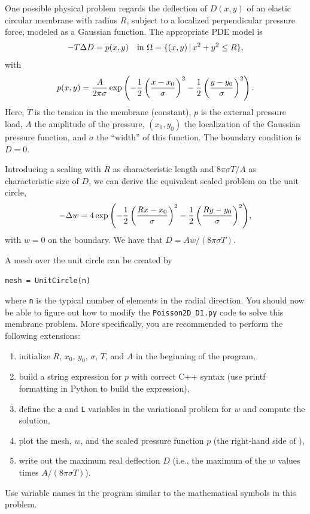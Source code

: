 One possible physical problem regards the deflection
of $D(x,y)$ of an elastic circular membrane
with radius $R$, subject to a localized perpendicular pressure
force, modeled as a Gaussian function.
The appropriate PDE model is
\begin{equation}
-T\Delta D = p(x,y)\quad\hbox{in }\Omega = \{ (x,y)\,|\, x^2+y^2\leq R\},
\end{equation}
with
\begin{equation}
p(x,y) = {A\over 2\pi\sigma}\exp{\left(
- {1\over2}\left( {x-x_0\over\sigma}\right)^2
- {1\over2}\left( {y-y_0\over\sigma}\right)^2
\right)}\, .
\end{equation}
Here, $T$ is the tension in the membrane (constant), $p$ is the external
pressure load,
$A$ the amplitude of the pressure, $(x_0,y_0)$ the localization of
the Gaussian pressure function, and $\sigma$ the ``width'' of this
function. The boundary condition is $D=0$.

Introducing a scaling with $R$ as characteristic length and
$8\pi\sigma T/A$ as characteristic size of $D$, we can derive the equivalent
scaled problem on the unit circle,
\begin{equation}
\label{langtangen:poisson1:membrane:scaled:eq}
-\Delta w =
4\exp{\left(
- {1\over2}\left( {Rx-x_0\over\sigma}\right)^2
- {1\over2}\left( {Ry-y_0\over\sigma}\right)^2
\right)},
\end{equation}
with $w=0$ on the boundary. We have that $D = Aw/(8\pi\sigma T)$.

A mesh over the unit circle can be created
by
\begin{Verbatim}[fontsize=\fontsize{10pt}{10pt},tabsize=8,baselinestretch=1.05,
fontfamily=tt,xleftmargin=7mm]
mesh = UnitCircle(n)
\end{Verbatim}
\noindent
where {\fontsize{12pt}{12pt}\texttt{n}} is the typical number of elements in the radial direction.
You should now be able to figure out how to modify the
{\fontsize{12pt}{12pt}\verb!Poisson2D_D1.py!} code to solve this membrane problem.
More specifically, you are recommended to perform the following extensions:
\begin{enumerate}
\item  initialize $R$, $x_0$, $y_0$, $\sigma$, $T$, and $A$ in the
beginning of the program,
\item
build a string expression for $p$ with correct C++ syntax
(use printf formatting in Python to build the expression),
\item
define the {\fontsize{12pt}{12pt}\texttt{a}} and {\fontsize{12pt}{12pt}\texttt{L}} variables in the variational problem for
$w$ and compute the solution,
\item plot the mesh,
$w$, and the scaled pressure function $p$ (the right-hand side of
),
\item write out the maximum real deflection $D$
(i.e., the maximum of the $w$ values times $A/(8\pi\sigma T)$).
\end{enumerate}
Use variable names in the program similar to the mathematical symbols
in this problem.

